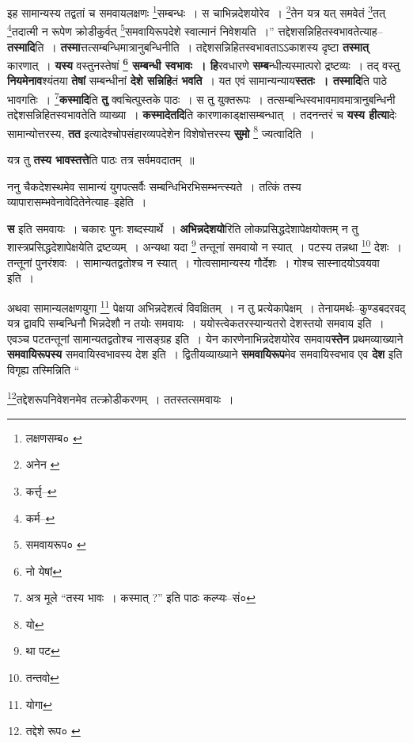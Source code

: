 \documentclass[article,12pt,a4paper]{memoir}
\begin{document}
	इह सामान्यस्य तद्वतां च समवायलक्षणः \footnote{लक्षणसम्ब० \cite{dp-msA}}\-सम्बन्धः । स चाभिन्नदेशयोरेव । \footnote{अनेन \cite{dp-msB}}\-तेन यत्र यत् समवेतं \footnote{कर्त्तृ--\cite{dp-msD-n}}\-तत् \footnote{कर्म--\cite{dp-msD-n}}\-तदात्मी न रूपेण क्रोडीकुर्वत् \footnote{समवायरूप० \cite{dp-msC}}\-समवायिरूपदेशे स्वात्मानं निवेशयति ।” त्तद्देशसन्निहितस्वभावतेत्याह--\textbf{तस्मादि}ति । \textbf{तस्मा}त्तत्सम्बन्धिमात्रानुबन्धिनीति । तद्देशसन्निहितस्वभावताऽऽकाशस्य दृष्टा \textbf{तस्मात्} कारणात् । \textbf{यस्य} वस्तुनस्तेषां \textbf{\footnote{नो येषां} सम्बन्धी स्वभावः । हि}रवधारणे \textbf{सम्ब}न्धीत्यस्मात्परो द्रष्टव्यः । तद् वस्तु \textbf{नियमेनाव}श्यंतया \textbf{तेषां} सम्बन्धीनां \textbf{देशे सन्निहि}तं \textbf{भवति} । यत एवं सामान्यन्याय\textbf{स्ततः । तस्मादि}ति पाठे भावगतिः । \footnote{अत्र मूले “तस्य भावः । कस्मात् ?” इति पाठः कल्प्यः--सं०}\textbf{कस्मादि}ति \textbf{तु} क्वचित्पुस्तके पाठः । स तु युक्तरूपः । तत्सम्बन्धिस्वभावमावमात्रानुबन्धिनी तद्देशसन्निहितस्वभावतेति व्याख्या । \textbf{कस्मादेतदि}ति कारणाकाड्क्षासम्बन्धात् । तदनन्तरं च \textbf{यस्य हीत्या}देः सामान्योत्तरस्य, \textbf{तत} इत्यादेश्चोपसंहारव्यपदेशेन विशेषोत्तरस्य \textbf{सुमो} \footnote{यो} ज्यत्वादिति ।
	\pend
      

	  \pstart यत्र तु \textbf{तस्य भावस्तत्ते}ति पाठः तत्र सर्वमवदातम् ॥
	\pend
      

	  \pstart ननु चैकदेशस्थमेव सामान्यं युगपत्सर्वैः सम्बन्धिभिरभिसम्भन्त्स्यते । तत्किं तस्य व्यापारासम्भवेनावेदितेनेत्याह--इहेति ।
	\pend
      

	  \pstart \textbf{स} इति समवायः । चकारः पुनः शब्दस्यार्थे । \textbf{अभिन्नदेशयो}रिति लोकप्रसिद्धदेशापेक्षयोक्तम् न तु शास्त्रप्रसिद्धदेशापेक्षयेति द्रष्टव्यम् । अन्यथा यदा \footnote{था पट} तन्तूनां समवायो न स्यात् । पटस्य तन्नथा \footnote{तन्तवो} देशः । तन्तूनां पुनरंशवः । सामान्यतद्वतोश्च न स्यात् । गोत्वसामान्यस्य गौर्देशः । गोश्च सास्नादयोऽवयवा इति ।
	\pend
      

	  \pstart अथवा सामान्यलक्षणयुगा \footnote{योगा} पेक्षया अभिन्नदेशत्वं विवक्षितम् । न तु प्रत्येकापेक्षम् । तेनायमर्थः--कुण्डबदरवद् यत्र द्वावपि सम्बन्धिनौ भिन्नदेशौ न तयोः समवायः । ययोस्त्वेकतरस्यान्यतरो देशस्तयो समवाय इति । एवञ्च पटतन्तूनां सामान्यतद्वतोश्च नासङ्ग्रह इति । येन कारणेनाभिन्नदेशयोरेव समवाय\textbf{स्तेन} प्रथमव्याख्याने \textbf{समवायिरूपस्य} समवायिस्वभावस्य देश इति । द्वितीयव्याख्याने \textbf{समवायिरूप}मेव समवायिस्वभाव एव \textbf{देश} इति विगृह्य तस्मिन्निति  \leavevmode{} “
	  
	\footnote{तद्देशे रूप० \cite{dp-msD}}\-तद्देशरूपनिवेशनमेव तत्क्रोडीकरणम् । ततस्तत्समवायः । 
	  
\end{document}
